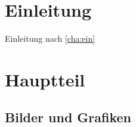

     

\maketitle

\pagestyle{scrplain}
\cleardoubleemptypage 
{}
\tableofcontents
\newpage
\listoffigures
\newpage
\listoftables
\newpage
\listofalgorithms
\newpage

\usetwonomenclatures
\printnomenclature

\cleardoubleemptypage
\pagestyle{scrheadings}
\setcounter{page}{1}
\chapter{Einleitung}\label{cha:ein}
Einleitung nach \autoref{cha:ein}

\chapter{Hauptteil}\label{cha:haupt}
\section{Bilder und Grafiken}\label{sec:grafiken}
